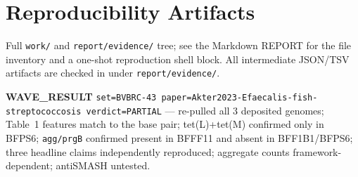 \documentclass[11pt]{article}
\begin{document}
\section{Reproducibility Artifacts}
Full \texttt{work/} and \texttt{report/evidence/} tree; see the Markdown REPORT for the file inventory and a one-shot reproduction shell block. All intermediate JSON/TSV artifacts are checked in under \texttt{report/evidence/}.

\vfill
\noindent\textbf{WAVE\_RESULT} \texttt{set=BVBRC-43 paper=Akter2023-Efaecalis-fish-streptococcosis verdict=PARTIAL} --- re-pulled all 3 deposited genomes; Table~1 features match to the base pair; tet(L)+tet(M) confirmed only in BFPS6; \texttt{agg/prgB} confirmed present in BFFF11 and absent in BFF1B1/BFPS6; three headline claims independently reproduced; aggregate counts framework-dependent; antiSMASH untested.
\end{document}

